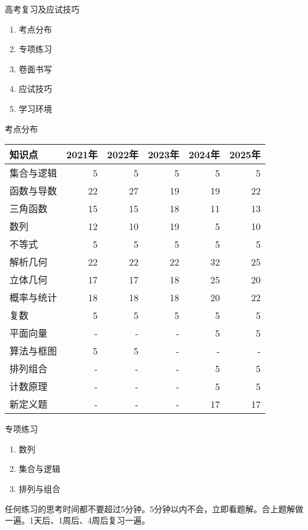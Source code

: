 \documentclass[aspectratio=169]{ctexbeamer} %
\date{\today}
\begin{document}
\begin{frame}[t]{高考复习及应试技巧}
\begin{enumerate}[label={\arabic*.}]
\item 考点分布
\item 专项练习
\item 卷面书写
\item 应试技巧
\item 学习环境
\end{enumerate}
\end{frame}

\begin{frame}[t]{考点分布}
\begin{longtable}{@{} l r r r r r @{}}
\toprule
知识点 & 2021年 & 2022年 & 2023年 & 2024年 & 2025年 \\
\midrule
集合与逻辑 & 5 & 5 & 5 & 5 & 5 \\
函数与导数 & 22 & 27 & 19 & 19 & 22 \\
三角函数 & 15 & 15 & 18 & 11 & 13 \\
数列 & 12 & 10 & 19 & 5 & 10 \\
不等式 & 5 & 5 & 5 & 5 & 5 \\
解析几何 & 22 & 22 & 22 & 32 & 25 \\
立体几何 & 17 & 17 & 18 & 25 & 20 \\
概率与统计 & 18 & 18 & 18 & 20 & 22 \\
复数 & 5 & 5 & 5 & 5 & 5 \\
平面向量 & - & - & - & 5 & 5 \\
算法与框图 & 5 & 5 & - & - & - \\
排列组合 & - & - & - & 5 & 5 \\
计数原理 & - & - & - & 5 & 5 \\
新定义题 & - & - & - & 17 & 17 \\
\bottomrule
\end{longtable}
\end{frame}

\begin{frame}[t]{专项练习}
\begin{enumerate}[label={\arabic*.}]
\item 数列
\item 集合与逻辑
\item 排列与组合
\end{enumerate}
\alert{任何练习的思考时间都不要超过5分钟。5分钟以内不会，立即看题解。合上题解做一遍。1天后、1周后、4周后复习一遍。}
\end{frame}
\end{document}
